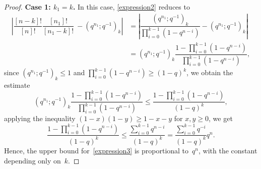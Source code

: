 \documentclass[12pt, a4paper]{amsart}
\numberwithin{equation}{subsection}
\theoremstyle{definition}
\begin{document}
\begin{proof}
\textbf{Case 1: \( k_1 = k \).}  
In this case, \eqref{expression2} reduces to
\begin{align} \label{expression3}
\left|\dfrac{[n-k]!}{[n]!} \dfrac{[n_{1}]!}{[n_{1}-k]!}\ - (q^{n_{1}}; q^{-1})_{k}\right|  
&= \left|\dfrac{ (q^{n_{1}}; q^{-1})_{k}}{\prod_{i=0}^{k-1}(1 - q^{n - i})} - (q^{n_{1}}; q^{-1})_{k}\right| \\
&=  \nonumber(q^{n_{1}}; q^{-1})_{k} \dfrac{1 - \prod_{i=0}^{k-1}(1 - q^{n - i})}{\prod_{i=0}^{k-1}(1 - q^{n - i})},
\end{align}
since $(q^{n_{1}}; q^{-1})_{k} \leqslant 1$ and
${\prod_{i=0}^{k-1}(1 - q^{n - i})} \geqslant (1 - q)^{k}$, we obtain the estimate
\begin{equation}
 (q^{n_{1}}; q^{-1})_{k} \dfrac{1 - \prod_{i=0}^{k-1}(1 - q^{n - i})}{\prod_{i=0}^{k-1}(1 - q^{n - i})} \leqslant \dfrac{1 - \prod_{i=0}^{k-1}(1 - q^{n - i})}{(1-q)^{k}},
\end{equation} 
applying the inequality $(1 - x)(1 - y) \geq 1 - x - y$ for $x, y \geqslant 0$, we get
\begin{equation}\label{express_k=k1}
\dfrac{1 - \prod_{i=0}^{k-1}(1 - q^{n - i})}{(1-q)^{k}} \leqslant \dfrac{\sum_{i=0}^{k-1} q^{n-i}}{(1-q)^{k}} = \dfrac{\sum_{i=0}^{k-1} q^{-i}}{(1-q)^{k}} q^{n} .
\end{equation} 
Hence, the upper bound for~\eqref{expression3} is proportional to~$q^n$, with the constant depending only on~$k$.







\end{proof}
\end{document}
